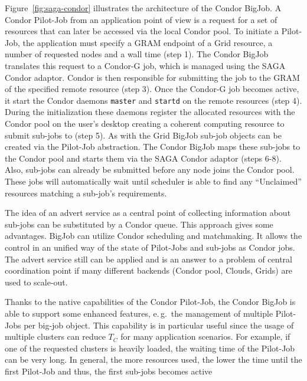 \documentclass[conference,final]{IEEEtran}
\newcommand{\tc}{$T_{C}$ }
\newcommand{\jhanote}[1]{ {\textcolor{red} { ***SJ: #1 }}}
\newcommand{\jhanote}[1]{}
\begin{document}

Figure~\ref{fig:saga-condor} illustrates the architecture of the Condor BigJob.
A Condor Pilot-Job from an application point of view is a request 
for a set of resources that can later be accessed via the local Condor pool. 
To initiate a Pilot-Job, the application must specify a GRAM endpoint 
of a Grid resource, a number of requested nodes and a wall time (step 1). 
The Condor BigJob translates this request to a Condor-G job, which is managed
using the SAGA Condor adaptor. Condor is then responsible for submitting 
the job to the GRAM of the specified remote resource (step 3). Once the Condor-G
job becomes active, it start the Condor daemons \texttt{master} and \texttt{startd} on 
the remote resources (step 4). During the initialization these 
daemons register the allocated resources with the Condor
pool on the user's desktop creating a coherent computing resource to
submit sub-jobs to (step 5). As with the Grid BigJob sub-job objects
can be created via the Pilot-Job abstraction. The Condor BigJob maps these
sub-jobs to the Condor pool and starts them via the SAGA Condor adaptor (steps 6-8). 
Also, sub-jobs can already be submitted before any node joins the
Condor pool. These jobs will automatically wait until scheduler is able to find any
``Unclaimed'' resources matching a sub-job's requirements. 

The idea of an advert service as a central point of collecting
information about sub-jobs can be substituted by a Condor queue. This
approach gives some advantages.  BigJob can utilize Condor scheduling
and matchmaking. It allows the control in an unified way of the state
of Pilot-Jobs and sub-jobs as Condor jobs. The advert service still
can be applied and is an answer to a problem of central coordination
point if many different backends (Condor pool, Clouds, Grids) are
used to scale-out.

Thanks to the native capabilities of the Condor Pilot-Job, the Condor BigJob
is able to support some enhanced features, e.\,g.\ the management
of multiple Pilot-Jobs per big-job object. This capability is in particular
useful since the usage of multiple clusters can reduce \tc for many application
scenarios. For example, if one of the requested clusters is heavily loaded, the
waiting time of the Pilot-Job can be very long. In general, the more resources used, the 
lower the time until the first Pilot-Job and thus, the first sub-jobs becomes
active 
\end{document}
